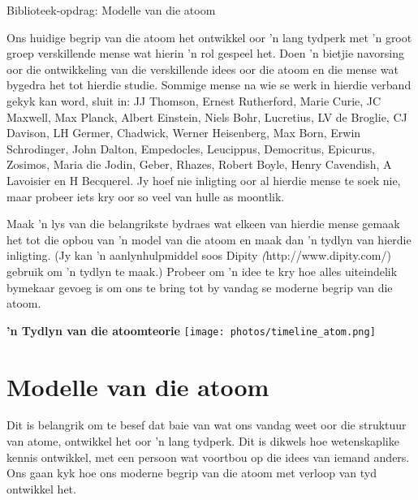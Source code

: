 \begin{project}{Biblioteek-opdrag: Modelle van die atoom}
            \nopagebreak
            \label{m38756*eip-3}

Ons huidige begrip van die atoom het ontwikkel oor 'n lang tydperk met 'n groot groep verskillende mense wat hierin 'n rol gespeel het. Doen 'n bietjie navorsing oor die ontwikkeling van die verskillende idees oor die atoom en die mense wat bygedra het tot hierdie studie. Sommige mense na wie se werk in hierdie verband gekyk kan word, sluit in: JJ Thomson, Ernest Rutherford, Marie Curie, JC Maxwell, Max Planck, Albert Einstein, Niels Bohr, Lucretius, LV de Broglie, CJ Davison, LH Germer, Chadwick, Werner Heisenberg, Max Born, Erwin Schrodinger, John Dalton, Empedocles, Leucippus,
Democritus, Epicurus, Zosimos, Maria die Jodin, Geber, Rhazes, Robert Boyle, Henry Cavendish, A Lavoisier en H Becquerel. Jy hoef nie inligting oor al hierdie mense te soek nie, maar probeer iets kry oor so veel van hulle as moontlik.
\par \begin{minipage}{.6\textwidth}
\label{m38756*id7342}Maak 'n lys van die belangrikste bydraes wat elkeen van hierdie mense gemaak het tot die opbou van 'n model van die atoom en maak dan 'n tydlyn van hier\-die inligting. (Jy kan 'n aanlynhulpmiddel soos Dipity \textsl(http://www.dipity.com/) gebruik om 'n tydlyn te maak.) Probeer om 'n idee te kry hoe alles uiteindelik bymekaar gevoeg is om ons te bring tot by vandag se moderne begrip van die atoom.
\end{minipage}
\begin{minipage}{.4\textwidth}
 \begin{center}
\textbf{'n Tydlyn van die atoomteorie}
  \texttt{[image: photos/timeline\_atom.png]}
 \end{center}

\end{minipage}

\end{project}
\par \label{m38756*cid2}

\section{Modelle van die atoom}
            \nopagebreak
      \label{m38756*id254164}Dit is belangrik om te besef dat baie van wat ons vandag weet oor die struktuur van atome, ontwikkel het oor 'n lang tydperk. Dit is dikwels hoe wetenskaplike kennis ontwikkel, met een persoon wat voortbou op die idees van iemand anders. Ons gaan kyk hoe ons moderne begrip van die atoom met verloop van tyd ontwikkel het.\par 

